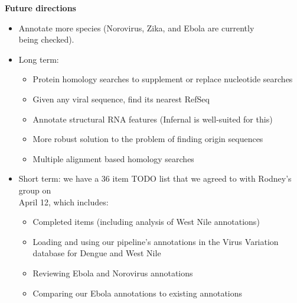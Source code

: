 \documentclass[landscape]{slides}
\begin{document}
\begin{slide}
\begin{center}
\textbf{Future directions}

\small
\begin{itemize}
\item Annotate more species (Norovirus, Zika, and Ebola are currently \\ being checked).

\item Long term:
\begin{itemize}
\item  Protein homology searches to supplement or replace nucleotide searches
\item  Given any viral sequence, find its nearest RefSeq
\item  Annotate structural RNA features (Infernal is well-suited for this)
\item  More robust solution to the problem of finding origin sequences
\item  Multiple alignment based homology searches 
\end{itemize}

\item Short term: we have a 36 item TODO list that we agreed to with
  Rodney's group on \\ April 12, which includes:
\begin{itemize}
  \item Completed items (including analysis of West Nile annotations)
  \item Loading and using our pipeline's annotations in the Virus Variation
    database for Dengue and West Nile
  \item Reviewing Ebola and Norovirus annotations
  \item Comparing our Ebola annotations to existing annotations
\end{itemize}
\end{itemize}

\vfill
\end{center}
\end{slide}
\end{document}
